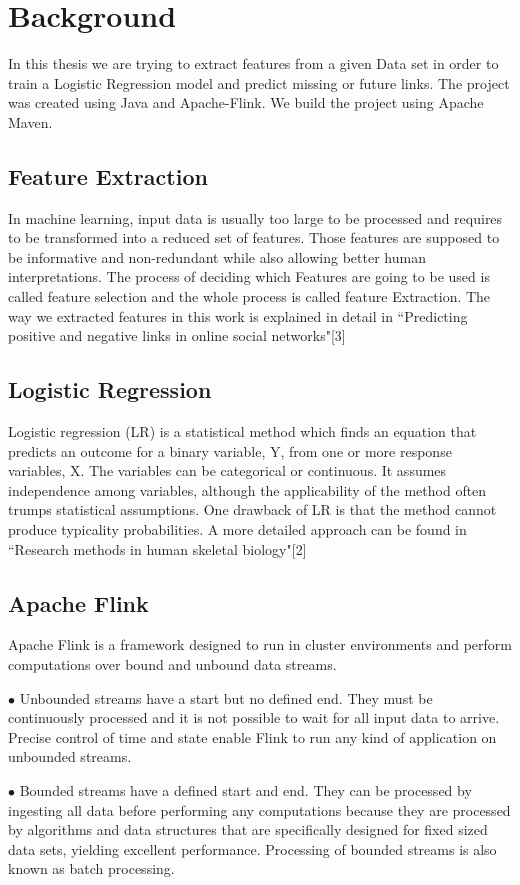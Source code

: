 
\chapter{Background}

In this thesis we are trying to extract features from a given Data set in order to train a Logistic Regression model and predict missing or future links.
The project was created using Java and Apache-Flink. We build the project using Apache Maven. 
 





\section{Feature Extraction}
In machine learning, input data is usually too large to be processed and requires to be transformed into a reduced set of features. Those features are supposed to be informative and non-redundant while also allowing better human interpretations. The process of deciding which Features are going to be used is called feature selection and the whole process is called feature Extraction. The way we extracted features in this work is explained in detail in ``Predicting positive and negative links in online social networks"[3] 
\section{Logistic Regression}
Logistic regression (LR) is a statistical method which finds an equation that predicts an outcome for a binary variable, Y, from one or more response variables, X. The variables can be categorical or continuous. It assumes independence among variables, although the applicability of the method often trumps statistical assumptions. One drawback of LR is that the method cannot produce typicality probabilities. A more detailed approach can be found in ``Research methods in human skeletal biology"[2]

\section{Apache Flink}

Apache Flink is a framework designed to run in cluster environments and perform computations over bound and unbound data streams. 
    \begin{description}
    \item $\bullet$ Unbounded streams have a start but no defined end. They must be continuously processed and it is not possible to wait for all input data to arrive.
    Precise control of time and state enable Flink to run any kind of application on unbounded streams. 

    \item $\bullet$ Bounded streams have a defined start and end. They can be processed by ingesting all data before performing any computations because they are processed by algorithms and data structures that are specifically designed for fixed sized data sets, yielding excellent performance.
    Processing of bounded streams is also known as batch processing.
    \end{description}
    

